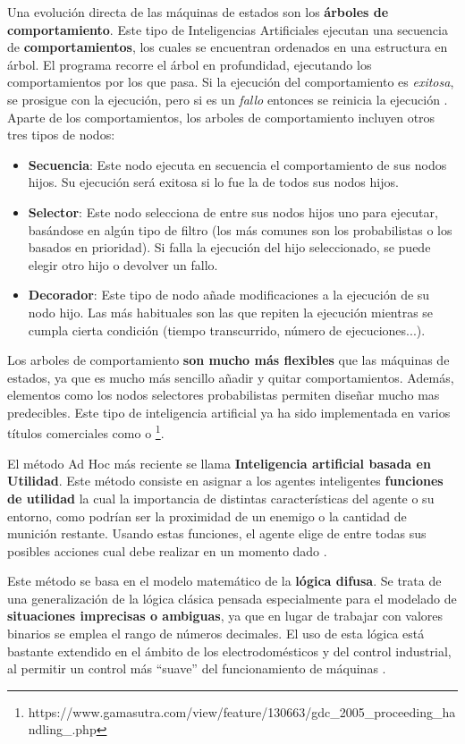 Una evolución directa de las máquinas de estados son los \textbf{árboles de comportamiento}. Este tipo de Inteligencias Artificiales ejecutan una secuencia de \textbf{comportamientos}, los cuales se encuentran ordenados en una estructura en árbol. El programa recorre el árbol en profundidad, ejecutando los comportamientos por los que pasa. Si la ejecución del comportamiento es \textit{exitosa}, se prosigue con la ejecución, pero si es un \textit{fallo} entonces se reinicia la ejecución \cite{ai_and_games}. Aparte de los comportamientos, los arboles de comportamiento incluyen otros tres tipos de nodos:
\begin{itemize}
\item \textbf{Secuencia}: Este nodo ejecuta en secuencia el comportamiento de sus nodos hijos. Su ejecución será exitosa si lo fue la de todos sus nodos hijos.
\item \textbf{Selector}: Este nodo selecciona de entre sus nodos hijos uno para ejecutar, basándose en algún tipo de filtro (los más comunes son los probabilistas o los basados en prioridad). Si falla la ejecución del hijo seleccionado, se puede elegir otro hijo o devolver un fallo.
\item \textbf{Decorador}: Este tipo de nodo añade modificaciones a la ejecución de su nodo hijo. Las más habituales son las que repiten la ejecución mientras se cumpla cierta condición (tiempo transcurrido, número de ejecuciones...).
\end{itemize}

Los arboles de comportamiento \textbf{son mucho más flexibles} que las máquinas de estados, ya que es mucho más sencillo añadir y quitar comportamientos. Además, elementos como los nodos selectores probabilistas permiten diseñar mucho mas predecibles. Este tipo de inteligencia artificial ya ha sido implementada en varios títulos comerciales como  o \footnote{https://www.gamasutra.com/view/feature/130663/gdc\_2005\_proceeding\_handling\_.php}.

El método Ad Hoc más reciente se llama \textbf{Inteligencia artificial basada en Utilidad}. Este método consiste en asignar a los agentes inteligentes \textbf{funciones de utilidad} la cual la importancia de distintas características del agente o su entorno, como podrían ser la proximidad de un enemigo o la cantidad de munición restante. Usando estas funciones, el agente elige de entre todas sus posibles acciones cual debe realizar en un momento dado \cite{ai_and_games}.

Este método se basa en el modelo matemático de la \textbf{lógica difusa}. Se trata de una generalización de la lógica clásica pensada especialmente para el modelado de \textbf{situaciones imprecisas o ambiguas}, ya que en lugar de trabajar con valores binarios se emplea el rango de números decimales. El uso de esta lógica está bastante extendido en el ámbito de los electrodomésticos y del control industrial, al permitir un control más ``suave'' del funcionamiento de máquinas \cite{libro_esi}. 

